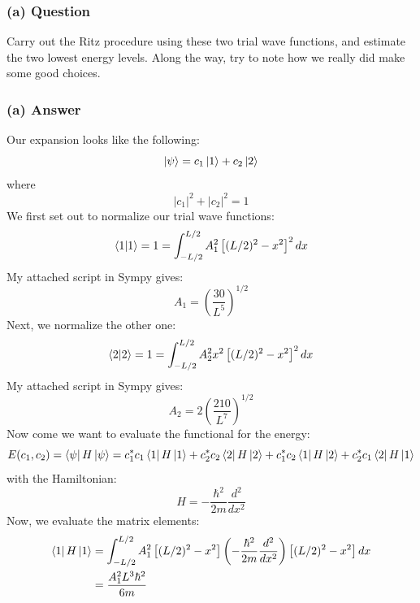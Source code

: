 \documentclass{article}
\begin{document}
\subsubsection*{(a) Question}
Carry out the Ritz procedure using these two trial wave functions, and estimate the two lowest energy levels. Along the way, try to note how we really did make some good choices.

\subsubsection*{(a) Answer}
Our expansion looks like the following:
\begin{equation}
    \ket{\psi} = c_1\ket{1} + c_2\ket{2}
\end{equation}
where
\begin{equation}
    |c_1|^2 + |c_2|^2 = 1
\end{equation}
We first set out to normalize our trial wave functions:
\begin{align}
    \braket{1}{1} = 1 &= \int_{-L/2}^{L/2} A_1^2 \left[ (L/2)^2 - x^2 \right]^2 dx \\
\end{align}
My attached script in Sympy gives:
\begin{equation}
\boxed{A_1 = \left(\frac{30}{L^5}\right)^{1/2}}
\end{equation}
Next, we normalize the other one:
\begin{align}
    \braket{2}{2} = 1 &= \int_{-L/2}^{L/2} A_2^2 x^2 \left[ (L/2)^2 - x^2 \right]^2 dx \\
\end{align}
My attached script in Sympy gives:
\begin{equation}
\boxed{A_2 = 2\left(\frac{210}{L^7}\right)^{1/2}}
\end{equation}
Now come we want to evaluate the functional for the energy:
\begin{equation}
    E(c_1, c_2) = \bra{\psi}H\ket{\psi} = c_1^*c_1\bra{1}H\ket{1} + c_2^*c_2\bra{2}H\ket{2} + c_1^*c_2\bra{1}H\ket{2} + c_2^*c_1\bra{2}H\ket{1}
\end{equation}
with the Hamiltonian:
\begin{equation}
    H = -\frac{\hbar^2}{2m}\frac{d^2}{dx^2}
\end{equation}
Now, we evaluate the matrix elements:
\begin{align}
    \bra{1}H\ket{1} &= \int_{-L/2}^{L/2} A_1^2 \left[ (L/2)^2 - x^2 \right] \left(-\frac{\hbar^2}{2m}\frac{d^2}{dx^2}\right) \left[ (L/2)^2 - x^2 \right] dx \\ &= \frac{A_1^2L^3\hbar^2}{6m}
\end{align}
\end{document}
